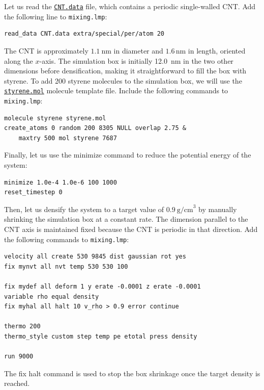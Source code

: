 \documentclass[9pt,tutorial]{livecoms}
\newcommand{\lmpcmd}[1]{\hspace{0pt}\colorbox{listing}{\textcolor{command}{\small{#1}}}\hspace{0pt}} %
\newcommand{\flecmd}[1]{\textcolor{command}{\texttt{#1}}} %
\newcommand{\dwlcmd}[1]{\textcolor{download}{\texttt{#1}}} %
\newcommand{\filepath}{https://raw.githubusercontent.com/lammpstutorials/lammpstutorials-article/main/files/}
\begin{document}
Let us read the \href{\filepath tutorial8/CNT.data}{\dwlcmd{CNT.data}} file, which
contains a periodic single-walled CNT.  Add the following line to \flecmd{mixing.lmp}:
\begin{lstlisting}
read_data CNT.data extra/special/per/atom 20
\end{lstlisting}
The CNT is approximately $1.1~\text{nm}$ in diameter and $1.6\,\text{nm}$ in length, oriented
along the $x$-axis. The simulation box is initially 12.0~nm in the two other dimensions before densification,
making it straightforward to fill the box with styrene.
To add 200 styrene molecules to the simulation box, we will use the
\href{\filepath tutorial8/styrene.mol}{\dwlcmd{styrene.mol}} molecule template file.
Include the following commands to \flecmd{mixing.lmp}:
\begin{lstlisting}
molecule styrene styrene.mol
create_atoms 0 random 200 8305 NULL overlap 2.75 &
    maxtry 500 mol styrene 7687
\end{lstlisting}
Finally, let us use the \lmpcmd{minimize} command to reduce the potential energy of the system:
\begin{lstlisting}
minimize 1.0e-4 1.0e-6 100 1000
reset_timestep 0
\end{lstlisting}

Then, let us densify the system to a target value of $0.9~\text{g/cm}^3$
by manually shrinking the simulation box at a constant rate.  The dimension parallel
to the CNT axis is maintained fixed because the CNT is periodic in that direction.
Add the following commands to \flecmd{mixing.lmp}:
\begin{lstlisting}
velocity all create 530 9845 dist gaussian rot yes
fix mynvt all nvt temp 530 530 100

fix mydef all deform 1 y erate -0.0001 z erate -0.0001
variable rho equal density
fix myhal all halt 10 v_rho > 0.9 error continue

thermo 200
thermo_style custom step temp pe etotal press density

run 9000
\end{lstlisting}
The \lmpcmd{fix halt} command is used to stop the box shrinkage once the
target density is reached.
\end{document}
